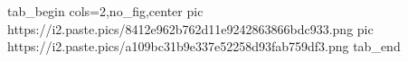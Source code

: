  
 
 
 
 


\ifcmt
  tab_begin cols=2,no_fig,center
	  pic https://i2.paste.pics/8412e962b762d11e9242863866bdc933.png
		pic https://i2.paste.pics/a109bc31b9e337e52258d93fab759df3.png
  tab_end
\fi
